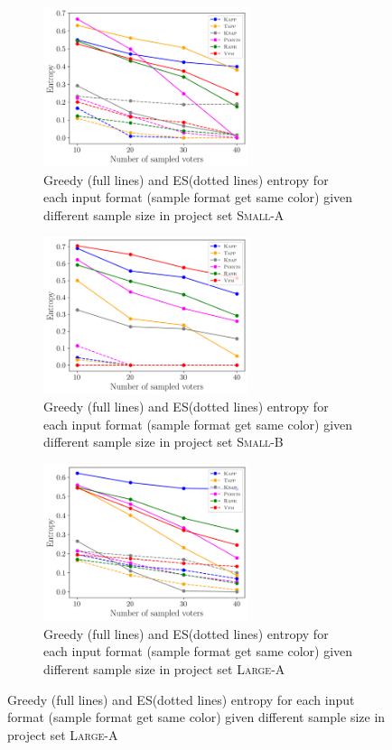\documentclass[runningheads]{llncs}
\newcommand{\mes}{ES}
\begin{document}
\begin{figure}[!h]
     \centering
          \begin{subfigure}[b]{0.45\textwidth}
         \centering
        \includegraphics[width=6cm]{experiment/entropy_small_a.png}
\caption{Greedy (full lines) and \mes (dotted lines) entropy  for each input format (sample format get same color) given different sample size in project set \textsc{Small-A} }\label{fig:entropy_sa}
     \end{subfigure}\hfill
     \begin{subfigure}[b]{0.45\textwidth}
         \centering
         \includegraphics[width=6cm]{experiment/entropy_small_b.png}
\caption{Greedy (full lines) and \mes (dotted lines) entropy  for each input format (sample format get same color) given different sample size in project set \textsc{Small-B}}\label{fig:entropy_sb}
     \end{subfigure}
     \hfill
     \begin{subfigure}[b]{0.45\textwidth}
         \centering
         \includegraphics[width=6cm]{experiment/entropy_large_a.png}
\caption{Greedy (full lines) and \mes (dotted lines) entropy  for each input format (sample format get same color) given different sample size in project set \textsc{Large-A} }\label{fig:entropy_la}

\end{subfigure}
\end{figure}
\end{document}
